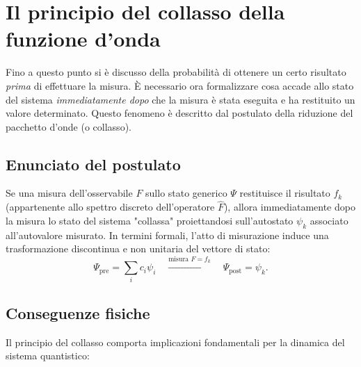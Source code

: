 \documentclass[a4paper,11pt]{report}
\begin{document}
\section{Il principio del collasso della funzione d'onda}
Fino a questo punto si è discusso della probabilità di ottenere un certo risultato \textit{prima} di effettuare la misura. È necessario ora formalizzare cosa accade allo stato del sistema \textit{immediatamente dopo} che la misura è stata eseguita e ha restituito un valore determinato.
Questo fenomeno è descritto dal postulato della riduzione del pacchetto d'onde (o collasso).

\subsection{Enunciato del postulato}
Se una misura dell'osservabile $F$ sullo stato generico $\Psi$ restituisce il risultato $f_k$ (appartenente allo spettro discreto dell'operatore $\hat{F}$), allora immediatamente dopo la misura lo stato del sistema "collassa" proiettandosi sull'autostato $\psi_k$ associato all'autovalore misurato.
In termini formali, l'atto di misurazione induce una trasformazione discontinua e non unitaria del vettore di stato:
\begin{equation}
    \Psi_{\text{pre}} = \sum_i c_i \psi_i \quad \xrightarrow{\text{misura } F = f_k} \quad \Psi_{\text{post}} = \psi_k.
\end{equation}

\subsection{Conseguenze fisiche}
Il principio del collasso comporta implicazioni fondamentali per la dinamica del sistema quantistico:
\end{document}
